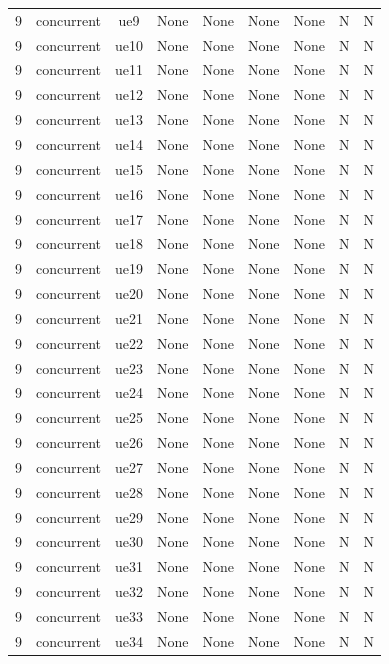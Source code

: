 \begin{table}[ht]
\begin{tabular}{|c|c|c|c|c|c|c|c|c|}
9 & concurrent & ue9 & None & None & None & None & N & N \\
9 & concurrent & ue10 & None & None & None & None & N & N \\
9 & concurrent & ue11 & None & None & None & None & N & N \\
9 & concurrent & ue12 & None & None & None & None & N & N \\
9 & concurrent & ue13 & None & None & None & None & N & N \\
9 & concurrent & ue14 & None & None & None & None & N & N \\
9 & concurrent & ue15 & None & None & None & None & N & N \\
9 & concurrent & ue16 & None & None & None & None & N & N \\
9 & concurrent & ue17 & None & None & None & None & N & N \\
9 & concurrent & ue18 & None & None & None & None & N & N \\
9 & concurrent & ue19 & None & None & None & None & N & N \\
9 & concurrent & ue20 & None & None & None & None & N & N \\
9 & concurrent & ue21 & None & None & None & None & N & N \\
9 & concurrent & ue22 & None & None & None & None & N & N \\
9 & concurrent & ue23 & None & None & None & None & N & N \\
9 & concurrent & ue24 & None & None & None & None & N & N \\
9 & concurrent & ue25 & None & None & None & None & N & N \\
9 & concurrent & ue26 & None & None & None & None & N & N \\
9 & concurrent & ue27 & None & None & None & None & N & N \\
9 & concurrent & ue28 & None & None & None & None & N & N \\
9 & concurrent & ue29 & None & None & None & None & N & N \\
9 & concurrent & ue30 & None & None & None & None & N & N \\
9 & concurrent & ue31 & None & None & None & None & N & N \\
9 & concurrent & ue32 & None & None & None & None & N & N \\
9 & concurrent & ue33 & None & None & None & None & N & N \\
9 & concurrent & ue34 & None & None & None & None & N & N \\

\end{tabular}
\end{table}
